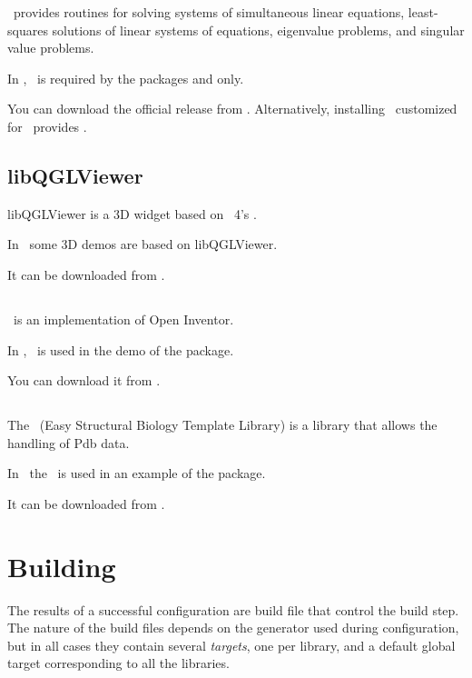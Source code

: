 \lapack\ provides routines for solving systems of simultaneous linear equations,
least-squares solutions of linear systems of equations, eigenvalue problems,
and singular value problems.

In \cgal, \lapack\ is required by the packages
and  only.

You can download the official release from \lapackpage.
Alternatively, installing \taucs\ customized for \cgal\ provides \lapack.

\subsection{libQGLViewer \label{thirdparty:libQGLViewer}}

libQGLViewer is a 3D widget based on \qt~4's .

In \cgal\ some 3D demos are based on libQGLViewer. 

It can be downloaded from \libqglviewerpage.

\subsection{\coin \label{thirdparty:Coin}}

\coin\ is an implementation of Open Inventor.  

In \cgal, \coin\ is used in the demo
of the  package. 

You can download it from \coinpage.

\subsection{\esbtl \label{thirdparty:ESBTL}}

The \esbtl\ (Easy Structural Biology Template Library) is a library that allows 
the handling of {\sc Pdb} data.

In \cgal\ the  \esbtl\ is used in an example of the 
 package.

It can be downloaded from \esbtlpage.

\section{Building \cgal \label{sec:building}}

The results of a successful configuration are build file that control the build step.
The nature of the build files depends on the generator used during configuration, but in all cases they 
contain several {\em targets}, one per library,  and a default global target corresponding 
to all the libraries.

